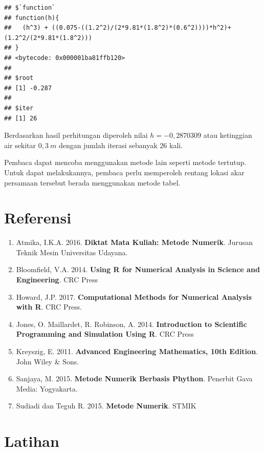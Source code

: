 \documentclass[
]{book}
\providecommand{\tightlist}{%
  \setlength{\itemsep}{0pt}\setlength{\parskip}{0pt}}
\theoremstyle{definition}
\theoremstyle{definition}
\theoremstyle{definition}
\theoremstyle{definition}
\theoremstyle{remark}
\begin{document}
\begin{verbatim}
## $`function`
## function(h){
##   (h^3) + ((0.075-((1.2^2)/(2*9.81*(1.8^2)*(0.6^2))))*h^2)+ (1.2^2/(2*9.81*(1.8^2)))
## }
## <bytecode: 0x000001ba81ffb120>
## 
## $root
## [1] -0.287
## 
## $iter
## [1] 26
\end{verbatim}

Berdasarkan hasil perhitungan diperoleh nilai \(h=-0,2870309\) atau ketinggian air sekitar \(0,3\ m\) dengan jumlah iterasi sebanyak \(26\) kali.

Pembaca dapat mencoba menggunakan metode lain seperti metode tertutup. Untuk dapat melakukannya, pembaca perlu memperoleh rentang lokasi akar persamaan tersebut berada menggunakan metode tabel.

\hypertarget{referensi-6}{%
\section{Referensi}\label{referensi-6}}

\begin{enumerate}
\def\labelenumi{\arabic{enumi}.}
\tightlist
\item
  Atmika, I.K.A. 2016. \textbf{Diktat Mata Kuliah: Metode Numerik}. Jurusan Teknik Mesin Universitas Udayana.
\item
  Bloomfield, V.A. 2014. \textbf{Using R for Numerical Analysis in Science and Engineering}. CRC Press
\item
  Howard, J.P. 2017. \textbf{Computational Methods for Numerical Analysis with R}. CRC Press.
\item
  Jones, O. Maillardet, R. Robinson, A. 2014. \textbf{Introduction to Scientific Programming and Simulation Using R}. CRC Press
\item
  Kreyszig, E. 2011. \textbf{Advanced Engineering Mathematics, 10th Edition}. John Wiley \& Sons.
\item
  Sanjaya, M. 2015. \textbf{Metode Numerik Berbasis Phython}. Penerbit Gava Media: Yogyakarta.
\item
  Sudiadi dan Teguh R. 2015. \textbf{Metode Numerik}. STMIK
\end{enumerate}

\hypertarget{latihan-1}{%
\section{Latihan}\label{latihan-1}}
\end{document}
